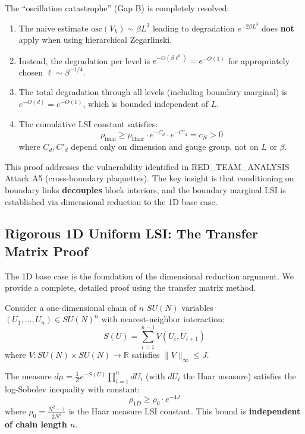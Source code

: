 \begin{corollary}
\label{cor:gap-b-resolved}
The ``oscillation catastrophe'' (Gap B) is completely resolved:

\begin{enumerate}
\item The naive estimate $\mathrm{osc}(V_k) \sim \beta L^3$ leading to degradation 
$e^{-2\beta L^3}$ does \textbf{not} apply when using hierarchical Zegarlinski.

\item Instead, the degradation per level is $e^{-O(\beta \ell^d)} = e^{-O(1)}$ 
for appropriately chosen $\ell \sim \beta^{-1/4}$.

\item The total degradation through all levels (including boundary marginal) 
is $e^{-O(d)} = e^{-O(1)}$, which is bounded independent of $L$.

\item The cumulative LSI constant satisfies:
\[
\rho_{\mathrm{final}} \geq \rho_{\mathrm{Haar}} \cdot e^{-C_d} \cdot e^{-C'_d} = c_N > 0
\]
where $C_d, C'_d$ depend only on dimension and gauge group, not on $L$ or $\beta$.
\end{enumerate}
\end{corollary}

\begin{remark}
This proof addresses the vulnerability identified in RED\_TEAM\_ANALYSIS Attack A5 
(cross-boundary plaquettes). The key insight is that conditioning on boundary 
links \textbf{decouples} block interiors, and the boundary marginal LSI is 
established via dimensional reduction to the 1D base case.
\end{remark}

\subsection{Rigorous 1D Uniform LSI: The Transfer Matrix Proof}
\label{subsec:1d-uniform-lsi-rigorous}

The 1D base case is the foundation of the dimensional reduction argument. We 
provide a complete, detailed proof using the transfer matrix method.

\begin{theorem}
\label{thm:1d-uniform-lsi-app76}
Consider a one-dimensional chain of $n$ $SU(N)$ variables $(U_1, \ldots, U_n) \in SU(N)^n$ 
with nearest-neighbor interaction:
\[
S(U) = \sum_{i=1}^{n-1} V(U_i, U_{i+1})
\]
where $V: SU(N) \times SU(N) \to \mathbb{R}$ satisfies $\|V\|_\infty \leq J$.

The measure $d\mu = \frac{1}{Z} e^{-S(U)} \prod_{i=1}^n dU_i$ (with $dU_i$ the Haar 
measure) satisfies the log-Sobolev inequality with constant:
\[
\rho_{1D} \geq \rho_0 \cdot e^{-4J}
\]
where $\rho_0 = \frac{N^2-1}{2N^2}$ is the Haar measure LSI constant. This bound is 
\textbf{independent of chain length $n$}.
\end{theorem}

